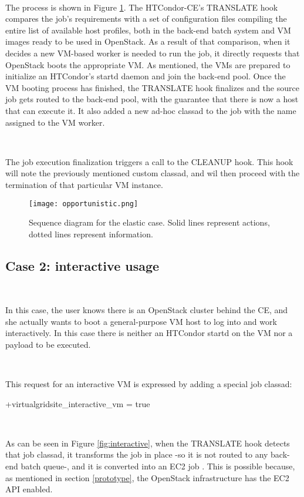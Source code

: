 \documentclass[a4paper]{jpconf}
\begin{document}
~

The process is shown in Figure \ref{fig:elastic}. 
The HTCondor-CE's TRANSLATE hook compares the job's requirements with a set of
configuration files compiling the entire list of available host profiles, 
both in the back-end batch system and VM images ready to be used in OpenStack.
As a result of that comparison, when it decides a new VM-based worker is needed
to run the job, it directly requests that OpenStack boots the appropriate VM.
As mentioned, the VMs are prepared to initialize an HTCondor's startd daemon and
join the back-end pool.
Once the VM booting process has finished, the TRANSLATE hook finalizes and the source job gets routed to the back-end pool,
with the guarantee that there is now a host that can execute it. 
It also added a new ad-hoc classad to the job with the name assigned to the VM
worker.

~

The job execution finalization triggers a call to the CLEANUP hook.
This hook will note the previously mentioned custom classad, and wil then
proceed with the termination of that particular VM instance.


\begin{figure}[h]
    \centering
    \texttt{[image: opportunistic.png]}
    \caption{Sequence diagram for the elastic case. Solid lines represent actions, dotted lines represent information.}
    \label{fig:elastic}
\end{figure}


\subsection{Case 2: interactive usage}

~

In this case, the user knows there is an OpenStack cluster behind the CE, 
and she actually wants to boot a general-purpose VM host to log into and work
interactively. 
In this case there is neither an HTCondor startd on the VM nor a payload to be executed.

~

This request for an interactive VM is expressed by adding a special job classad: 
\begin{center}
    +virtualgridsite\_interactive\_vm = true
\end{center}

~

As can be seen in Figure \ref{fig:interactive}, when the TRANSLATE hook detects that job classad, 
it transforms the job in place -so it is not routed to any back-end batch
queue-, and it is converted into an EC2 job \cite{condorec2}.
This is possible because, as mentioned in section \ref{prototype}, the OpenStack infrastructure has the EC2 API enabled. 
\end{document}
